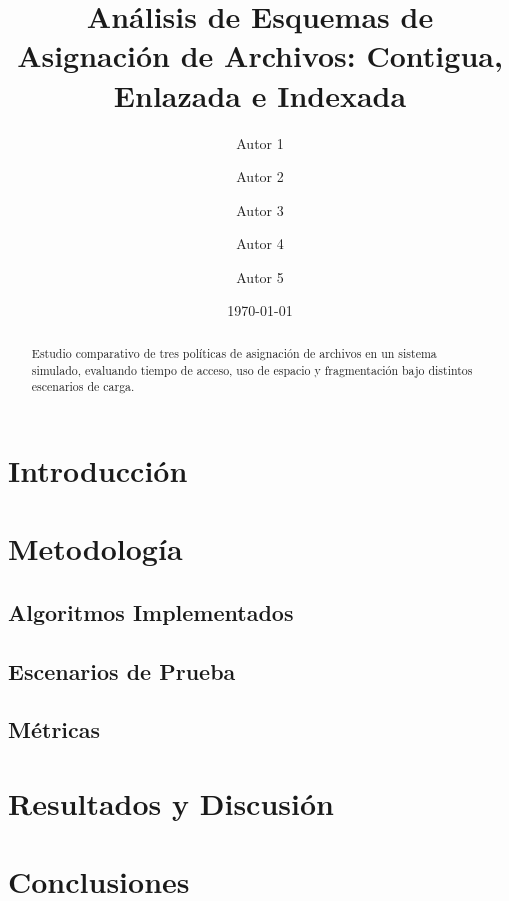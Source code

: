 \documentclass[11pt]{article}
\title{Análisis de Esquemas de Asignación de Archivos: Contigua, Enlazada e Indexada}
\author{Autor 1 \and Autor 2 \and Autor 3 \and Autor 4 \and Autor 5}
\date{\today}
\begin{document}
\maketitle

\begin{abstract}
Estudio comparativo de tres políticas de asignación de archivos en un sistema simulado, evaluando tiempo de acceso, uso de espacio y fragmentación bajo distintos escenarios de carga.
\end{abstract}

\section{Introducción}


\section{Metodología}
\subsection{Algoritmos Implementados}


\subsection{Escenarios de Prueba}


\subsection{Métricas}


\section{Resultados y Discusión}


\section{Conclusiones}




\end{document}
